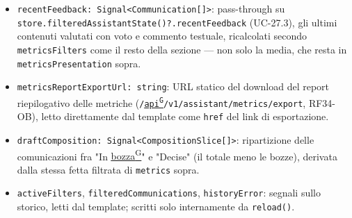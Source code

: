 \documentclass[a4paper,12pt]{article}
\providecommand{\glslink}[2]{\href{https://alittlebyte-19.github.io/Documentazione/glossario.html\#gls-#1}{\underline{#2}\textsuperscript{\scriptsize G}}}
\begin{document}
\begin{sloppypar}
\begin{itemize}
    \item \texttt{recentFeedback: Signal<Communication[]>}: pass-through su \texttt{store.filteredAssistantState()?.recentFeedback} (UC-27.3), gli ultimi contenuti valutati con voto e commento testuale, ricalcolati secondo \texttt{metricsFilters} come il resto della sezione — non solo la media, che resta in \texttt{metricsPresentation} sopra.
    \item \texttt{metricsReportExportUrl: string}: URL statico del download del report riepilogativo delle metriche (\texttt{/\glslink{api-application-programming-interface}{api}/v1/assistant/metrics/export}, RF34-OB), letto direttamente dal template come \texttt{href} del link di esportazione.
    \item \texttt{draftComposition: Signal<CompositionSlice[]>}: ripartizione delle comunicazioni fra "In \glslink{bozza-draft}{bozza}" e "Decise" (il totale meno le bozze), derivata dalla stessa fetta filtrata di \texttt{metrics} sopra.
    \item \texttt{activeFilters}, \texttt{filteredCommunications}, \texttt{historyError}: segnali sullo storico, letti dal template; scritti solo internamente da \texttt{reload()}.
\end{itemize}


\end{sloppypar}
\end{document}
